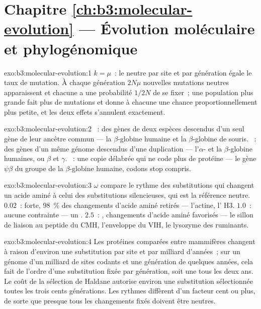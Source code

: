 \section*{Chapitre \ref{ch:b3:molecular-evolution} --- Évolution moléculaire et phylogénomique}

\begin{solution}{exo:b3:molecular-evolution:1}
$k = \mu$~: le  neutre par site et par génération
égale le taux de mutation. À chaque génération $2N\mu$ nouvelles
mutations neutres apparaissent et chacune a une probabilité $1/2N$ de se
fixer~; une population plus grande fait plus de mutations et donne à
chacune une chance proportionnellement plus petite, et les deux effets
s'annulent exactement.
\end{solution}

\begin{solution}{exo:b3:molecular-evolution:2}
~: des gènes de deux espèces descendus d'un seul gène de leur
ancêtre commun --- la $\beta$-globine humaine et la $\beta$-globine de
souris. ~: des gènes d'un même génome descendus d'une
duplication --- l'$\alpha$- et la $\beta$-globine humaines, ou $\beta$ et
$\gamma$. ~: une copie délabrée qui ne code plus de protéine
--- le gène $\psi\beta$ du groupe de la $\beta$-globine humaine, codons
stop compris.
\end{solution}

\begin{solution}{exo:b3:molecular-evolution:3}
$\omega$ compare le rythme des substitutions qui changent un acide aminé
à celui des substitutions silencieuses, qui est la référence neutre.
$0.02$~:  forte, \qty{98}{\%} des changements
d'acide aminé retirés --- l'actine, l' H3. $1.0$~: aucune
contrainte --- un . $2.5$~: , changements
d'acide aminé favorisés --- le sillon de liaison au peptide du CMH,
l'enveloppe du VIH, le lysozyme des ruminants.
\end{solution}

\begin{solution}{exo:b3:molecular-evolution:4}
Les protéines comparées entre mammifères changent à raison d'environ une
substitution par site et par milliard d'années~; sur un génome d'un
milliard de sites codants et une génération de quelques années, cela
fait de l'ordre d'une substitution fixée par génération, soit une tous
les deux ans. Le coût de la sélection de Haldane autorise environ une
substitution sélectionnée toutes les trois cents générations. Les
rythmes diffèrent d'un facteur cent ou plus, de sorte que presque tous
les changements fixés doivent être neutres.
\end{solution}


